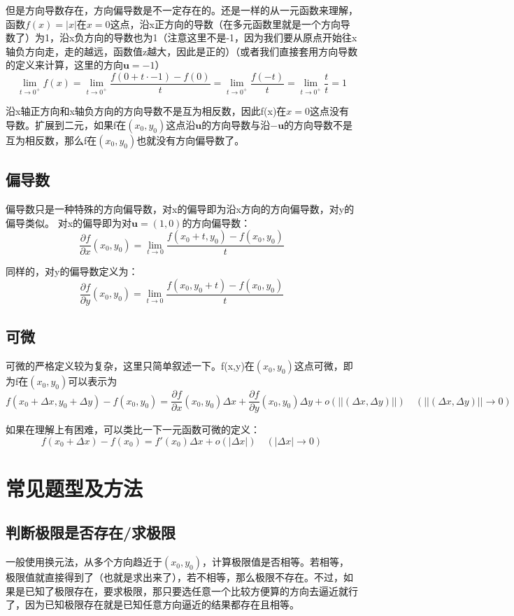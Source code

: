 \documentclass{article}
\begin{document}
但是方向导数存在，方向偏导数是不一定存在的。还是一样的从一元函数来理解，函数$f(x) = |x|$在$x=0$这点，沿x正方向的导数（在多元函数里就是一个方向导数了）为1，沿x负方向的导数也为1（注意这里不是-1，因为我们要从原点开始往x轴负方向走，走的越远，函数值z越大，因此是正的）（或者我们直接套用方向导数的定义来计算，这里的方向$\mathbf{u}=-1$）
\[\lim\limits_{t \rightarrow 0^+}f(x)=  \lim\limits_{t \rightarrow 0^+} \frac{f(0+t \cdot -1)-f(0)}{t} = 
\lim\limits_{t \rightarrow 0^+} \frac{f(-t)}{t} = \lim\limits_{t \rightarrow 0^+} \frac{t}{t}=1\]

沿x轴正方向和x轴负方向的方向导数不是互为相反数，因此f(x)在$x=0$这点没有导数。扩展到二元，如果f在$(x_0,y_0)$这点沿$\mathbf{u}$的方向导数与沿$-\mathbf{u}$的方向导数不是互为相反数，那么f在$(x_0,y_0)$也就没有方向偏导数了。


\subsection{偏导数}
偏导数只是一种特殊的方向偏导数，对x的偏导即为沿x方向的方向偏导数，对y的偏导类似。
对x的偏导即为对$\mathbf{u}=(1,0)$的方向偏导数：
\[\frac{\partial f}{\partial x}(x_0,y_0)= \lim\limits_{t \rightarrow 0}   \frac{f(x_0+t,y_0)-f(x_0,y_0)}{t}\]

同样的，对y的偏导数定义为：
\[\frac{\partial f}{\partial y}(x_0,y_0)= \lim\limits_{t \rightarrow 0}   \frac{f(x_0,y_0+t)-f(x_0,y_0)}{t}\]


\subsection{可微}
可微的严格定义较为复杂，这里只简单叙述一下。f(x,y)在$(x_0,y_0)$这点可微，即为f在$(x_0,y_0)$可以表示为
\[f(x_0+\Delta x,y_0+\Delta y)-f(x_0,y_0)= \frac{\partial f}{\partial x}(x_0,y_0)\Delta x+\frac{\partial f}{\partial y}(x_0,y_0)\Delta y+o(||(\Delta x,\Delta y)||) \quad (||(\Delta x,\Delta y)|| \rightarrow 0)\]

如果在理解上有困难，可以类比一下一元函数可微的定义：
\[f(x_0+\Delta x)-f(x_0)=f'(x_0)\Delta x+o(|\Delta x|) \quad (|\Delta x| \rightarrow 0)\]





\section{常见题型及方法}

\subsection{判断极限是否存在/求极限}
一般使用换元法，从多个方向趋近于$(x_0,y_0)$，计算极限值是否相等。若相等，极限值就直接得到了（也就是求出来了），若不相等，那么极限不存在。不过，如果是已知了极限存在，要求极限，那只要选任意一个比较方便算的方向去逼近就行了，因为已知极限存在就是已知任意方向逼近的结果都存在且相等。
\end{document}
